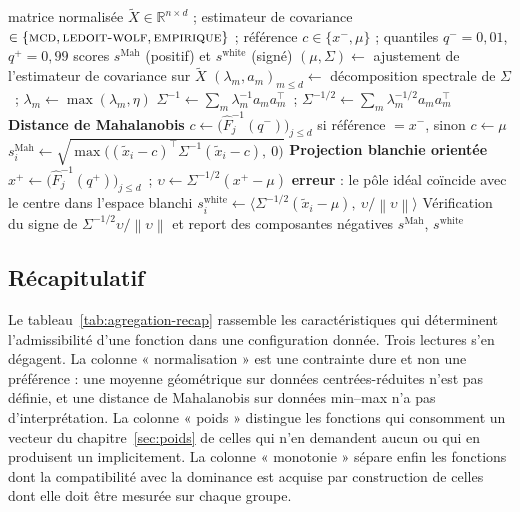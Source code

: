 \documentclass[11pt,a4paper]{article}
\theoremstyle{definition}
\theoremstyle{remark}
\newcommand{\R}{\mathbb{R}}
\newcommand{\norm}[1]{\left\lVert #1 \right\rVert}
\begin{document}
\begin{algorithm}[htbp]
  \caption{Scores blanchis : distance de Mahalanobis et projection orientée}
  \label{algo:blanchi}
  \begin{algorithmic}[1]
    \Require matrice normalisée $\tilde{X} \in \R^{n\times d}$ ; estimateur de covariance
      $\in \{\textsc{mcd}, \textsc{ledoit-wolf}, \textsc{empirique}\}$ ; référence
      $c \in \{x^{-}, \mu\}$ ; quantiles $q^{-} = 0{,}01$, $q^{+} = 0{,}99$
    \Ensure scores $s^{\mathrm{Mah}}$ (positif) et $s^{\mathrm{white}}$ (signé)
    \State $(\mu, \Sigma) \gets$ ajustement de l'estimateur de covariance sur $\tilde{X}$
    \State $(\lambda_m, a_m)_{m \le d} \gets$ décomposition spectrale de $\Sigma$~;\quad
      $\lambda_m \gets \max(\lambda_m, \eta)$
    \State $\Sigma^{-1} \gets \sum_m \lambda_m^{-1} a_m a_m^{\top}$~;\quad
      $\Sigma^{-1/2} \gets \sum_m \lambda_m^{-1/2} a_m a_m^{\top}$
    \Statex\hspace{-1.2em}\textbf{Distance de Mahalanobis}
    \State $c \gets \big(\hat{F}_j^{-1}(q^{-})\big)_{j \le d}$ si référence
      $= x^{-}$, sinon $c \gets \mu$
    \State $s^{\mathrm{Mah}}_i \gets
      \sqrt{\max\big((\tilde{x}_i - c)^{\top}\Sigma^{-1}(\tilde{x}_i - c),\ 0\big)}$
    \Statex\hspace{-1.2em}\textbf{Projection blanchie orientée}
    \State $x^{+} \gets \big(\hat{F}_j^{-1}(q^{+})\big)_{j \le d}$~;\quad
      $\upsilon \gets \Sigma^{-1/2}(x^{+} - \mu)$
    \If{$\norm{\upsilon} \le \eta$}
      \State \textbf{erreur} : le pôle idéal coïncide avec le centre dans l'espace blanchi
    \EndIf
    \State $s^{\mathrm{white}}_i \gets
      \big\langle \Sigma^{-1/2}(\tilde{x}_i - \mu),\ \upsilon/\norm{\upsilon}
      \big\rangle$
    \State Vérification du signe de $\Sigma^{-1/2}\upsilon/\norm{\upsilon}$ et report des
      composantes négatives
    \State \Return $s^{\mathrm{Mah}}$, $s^{\mathrm{white}}$
  \end{algorithmic}
\end{algorithm}

\bigskip

\subsection{Récapitulatif}
\label{sec:agregation-recap}

\medskip

Le tableau~\ref{tab:agregation-recap} rassemble les caractéristiques qui déterminent
l'admissibilité d'une fonction dans une configuration donnée. Trois lectures s'en
dégagent. La colonne « normalisation » est une contrainte dure et non une préférence :
une moyenne géométrique sur données centrées-réduites n'est pas définie, et une distance
de Mahalanobis sur données min--max n'a pas d'interprétation. La colonne « poids »
distingue les fonctions qui consomment un vecteur du chapitre~\ref{sec:poids} de celles
qui n'en demandent aucun ou qui en produisent un implicitement. La colonne « monotonie »
sépare enfin les fonctions dont la compatibilité avec la dominance est acquise par
construction de celles dont elle doit être mesurée sur chaque groupe.
\end{document}
